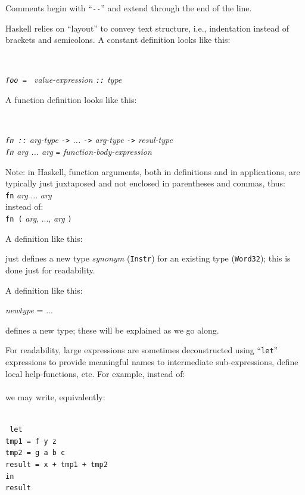 \documentclass[11pt]{article}
\newcommand{\hmm}{\hspace*{2em}}
\newcommand{\hmmm}{\hspace*{3em}}
\newcommand{\hmmmm}{\hspace*{4em}}
\begin{document}
Comments begin with ``\verb|--|'' and extend through the end of the line.

Haskell relies on ``layout'' to convey text structure, i.e.,
indentation instead of brackets and semicolons. A constant definition
looks like this:

\hmmmm \
\begin{minipage}[t]{4in}\it
{\tt foo = } value-expression {\tt ::} type
\end{minipage}

A function definition looks like this:

\hmmmm \
\begin{minipage}[t]{4in}\it
{\tt fn ::} arg-type {\tt ->} ... {\tt ->} arg-type {\tt ->} resul-type \\
{\tt fn} arg ... arg {\tt  =} function-body-expression
\end{minipage}

Note: in Haskell, function arguments, both in definitions
and in applications, are typically just juxtaposed and not enclosed in
parentheses and commas, thus: \\
\hspace*{2in} {\tt fn} \emph{arg} ... \emph{arg} \\
instead of: \\
\hspace*{2in} {\tt fn (} \emph{arg}, ..., \emph{arg} {\tt )}

A definition like this:

\hmmm {\tt type Instr = Word32}

just defines a new type \emph{synonym} ({\tt Instr}) for an existing type ({\tt Word32});
this is done just for readability.

A definition like this:

\hmmm {\tt data} \emph{newtype} = ...

defines a new type; these will be explained as we go along.

For readability, large expressions are sometimes deconstructed using
``{\tt let}'' expressions to provide meaningful names to intermediate
sub-expressions, define local help-functions, etc. For example,
instead of: \\
\hmmmm{\tt x + f y z - g a b c} \\
we may write, equivalently: \\
\hmmmm \
\begin{minipage}[t]{4in}\tt
let \\
\hmm tmp1 = f y z \\
\hmm tmp2 = g a b c \\
\hmm result = x + tmp1 + tmp2 \\
in \\
\hmm result
\end{minipage}
\end{document}

